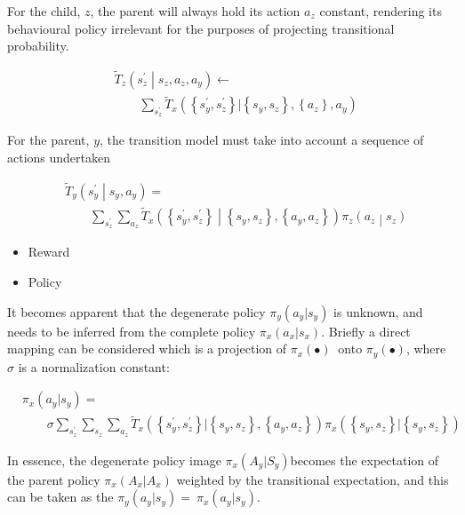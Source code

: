 \documentclass[compsoc,journal,letterpaper,10pt,draftcls,twocolumn]{IEEEtran}
\begin{document}
For the child, \(z\), the parent will always hold its action \(a_{z}\)
constant, rendering its behavioural policy irrelevant for the purposes
of projecting transitional probability.

 
\begin{align}
& {\tilde{T}}_{z}\left( s_{z}^{\prime}\middle| s_{z}, a_{z}, a_{y} \right) \leftarrow \nonumber \\ & \qquad \sum_{s_{z}^{\prime}}{{\tilde{T}}_{x}\left( \left\{ s_{y}^{\prime},s_{z}^{\prime} \right\}|\left\{ s_{y},s_{z}\right\},\left\{ a_{z} \right\},a_{y} \right)}
\end{align} 

For the parent, $y$, the transition model must take into account a
sequence of actions undertaken

 
\begin{align}
& {\tilde{T}}_{y}\left( s_{y}^{\prime}\middle| s_{y}, a_{y} \right) = \nonumber \\ 
& \qquad \sum_{s_{z}^{\prime}}{\sum_{a_{z}}{{\tilde{T}}_{x}\left( \left\{ s_{y}^{\prime},s_{z}^{\prime} \right\}\middle|\left\{ s_{y},s_{z} \right\},\left\{ a_{y},a_{z} \right\} \right)\pi_{z}\left( a_{z}\middle| s_{z} \right)}}
\end{align}
 

\begin{itemize}
\item
  Reward
\item
  Policy
\end{itemize}

It becomes apparent that the degenerate policy
\(\pi_{y}\left( a_{y}|s_{y} \right)\) is unknown, and needs to be
inferred from the complete policy \(\pi_{x}\left( a_{x}|s_{x} \right)\).
Briefly a direct mapping can be considered which is a projection of
\(\pi_{x}\left( \bullet \right)\ \) onto
\(\pi_{y}\left( \bullet \right)\), where \(\sigma\) is a normalization
constant:

\begin{align}
& \pi_{x}\left( a_{y}|s_{y} \right) = \nonumber \\ & \qquad \sigma\sum_{s_{z}^{'}}^{\ }{\sum_{s_{z}}^{\ }{\sum_{a_{z}}^{\ }{{\tilde{T}}_{x}\left( \left\{ s_{y}^{'},s_{z}^{'} \right\}|\left\{ s_{y}^{\ },s_{z}^{\ } \right\},\left\{ a_{y},a_{z} \right\} \right)\pi_{x}\left( \left\{ s_{y}^{\ },s_{z}^{\ } \right\}|\left\{ s_{y}^{\ },s_{z}^{\ } \right\} \right)}}}
\end{align}
 

In essence, the degenerate policy image
\(\pi_{x}\left( A_{y}|S_{y} \right)\)becomes the expectation of the
parent policy \(\pi_{x}\left( A_{x}|A_{x} \right)\) weighted by the
transitional expectation, and this can be taken as the
\(\pi_{y}\left( a_{y}|s_{y} \right) = \ \pi_{x}\left( a_{y}|s_{y} \right)\).
\end{document}
